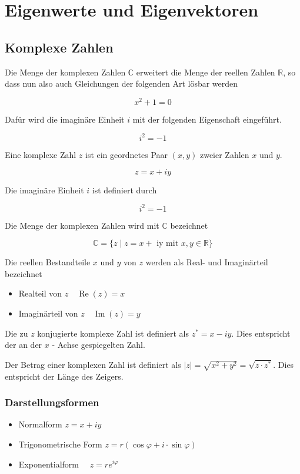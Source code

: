 \section{Eigenwerte und Eigenvektoren}

\subsection{Komplexe Zahlen}

Die Menge der komplexen Zahlen $\mathbb{C}$ erweitert die Menge der reellen Zahlen $\mathbb{R}$, so dass nun also auch Gleichungen der folgenden Art lösbar werden

$$
x^{2}+1=0
$$

Dafür wird die imaginäre Einheit $i$ mit der folgenden Eigenschaft eingeführt.

$$
i^{2}=-1
$$

Eine komplexe Zahl $z$ ist ein geordnetes Paar $(x, y)$ zweier Zahlen $x$ und $y$.

$$
z=x+i y
$$

Die imaginäre Einheit $i$ ist definiert durch

$$
i^{2}=-1
$$

Die Menge der komplexen Zahlen wird mit $\mathbb{C}$ bezeichnet

$$
\mathbb{C}=\{z \mid z=x+\text { iy mit } x, y \in \mathbb{R}\}
$$

Die reellen Bestandteile $x$ und $y$ von $z$ werden als Real- und Imaginärteil bezeichnet

\begin{itemize}
  \item Realteil von $z \quad \operatorname{Re}(z)=x$
  \item Imaginärteil von $z \quad \operatorname{Im}(z)=y$
\end{itemize}

Die zu $z$ konjugierte komplexe Zahl ist definiert als $z^{*}=x-i y$. Dies entspricht der an der $x$ - Achse gespiegelten Zahl.

Der Betrag einer komplexen Zahl ist definiert als $|z|=\sqrt{x^{2}+y^{2}}=\sqrt{z \cdot z^{*}}$. Dies entspricht der Länge des Zeigers.

\subsubsection*{Darstellungsformen}
\begin{itemize}
  \item Normalform $z=x+i y$
  \item Trigonometrische Form $z=r(\cos \varphi+i \cdot \sin \varphi)$
  \item Exponentialform $\quad z=r e^{i \varphi}$
\end{itemize}

